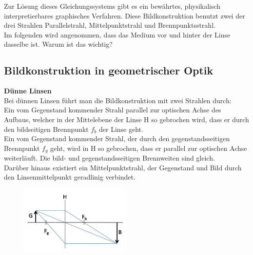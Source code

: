 \noindent
Zur Lösung dieses Gleichungssystems gibt es ein bewährtes, physikalisch interpretierbares graphisches Verfahren. Diese Bildkonstruktion benutzt zwei der drei Strahlen Parallelstrahl, Mittelpunktstrahl und Brennpunktsstrahl.\\

\noindent
Im folgenden wird angenommen, dass das Medium vor und hinter der Linse dasselbe ist. Warum ist das wichtig?

\subsection{Bildkonstruktion in geometrischer Optik}

\textbf{Dünne Linsen}\\
Bei dünnen Linsen führt man die Bildkonstruktion mit zwei Strahlen durch:\\
Ein vom Gegenstand kommender Strahl parallel zur optischen Achse des Aufbaus, welcher in der Mittelebene der Linse H so gebrochen wird, dass er durch den bildseitigen Brennpunkt $f_b$ der Linse geht.\\
Ein vom Gegenstand kommender Strahl, der durch den gegenstandsseitigen Brennpunkt $f_g$ geht, wird in H so gebrochen, dass er parallel zur optischen Achse weiterläuft. Die bild- und gegenstandsseitigen Brennweiten sind gleich.\\
Darüber hinaus existiert ein Mittelpunktstrahl, der Gegenstand und Bild durch den Linsenmittelpunkt geradlinig verbindet.\\
\begin{figure}[h]
	\centering
		\includegraphics[width=0.5\textwidth]{Abbildungen/duenne_linse.jpg}
	\label{fig:duenne_linse}
\end{figure}


